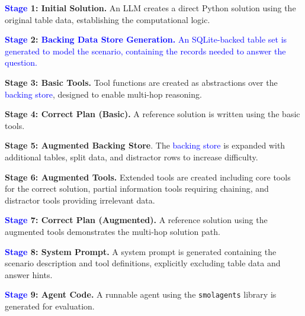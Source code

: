 \documentclass[11pt]{article}
\newcommand{\edit}[1]{\textcolor{blue}{#1}}
\begin{document}
\noindent \textbf{\edit{Stage} 1: Initial Solution.}
An LLM creates a direct Python solution using the original table data, establishing the computational logic.

\noindent \textbf{\edit{Stage} 2: \edit{Backing Data Store Generation.}}
\edit{An SQLite-backed table set is generated to model the scenario, containing the records needed to answer the question.}

\noindent \textbf{Stage 3: Basic Tools.}
Tool functions are created as abstractions over the \edit{backing store}, designed to enable multi-hop reasoning.

\noindent \textbf{Stage 4: Correct Plan (Basic).}
A reference solution is written using the basic tools.

\noindent \textbf{Stage 5: Augmented Backing Store}.
The \edit{backing store} is expanded with additional tables, split data, and distractor rows to increase difficulty.

\noindent \textbf{Stage 6: Augmented Tools.}
Extended tools are created including core tools for the correct solution, partial information tools requiring chaining, and distractor tools providing irrelevant data.


\noindent \textbf{\edit{Stage} 7: Correct Plan (Augmented).}
A reference solution using the augmented tools demonstrates the multi-hop solution path.

\noindent \textbf{\edit{Stage} 8: System Prompt.}
A system prompt is generated containing the scenario description and tool definitions, explicitly excluding table data and answer hints.

\noindent \textbf{\edit{Stage} 9: Agent Code.}
A runnable agent using the \texttt{smolagents} \citep{roucher2025smolagents} library is generated for evaluation.
\end{document}

